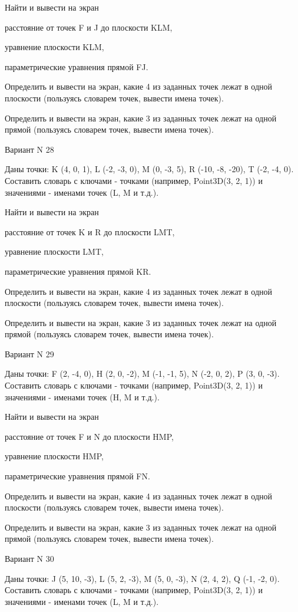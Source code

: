 \documentclass[11pt]{report}
\begin{document}
 
Найти и вывести на экран


расстояние от точек F и J до плоскости KLM,

 
уравнение плоскости KLM,

 
параметрические уравнения прямой FJ.


Определить и вывести на экран, какие 4 из заданных точек лежат в одной плоскости (пользуясь словарем точек, вывести имена точек).


Определить и вывести на экран, какие 3 из заданных точек лежат на одной прямой (пользуясь словарем точек, вывести имена точек).

Вариант N 28

Даны точки: K (4, 0, 1), L (-2, -3, 0), M (0, -3, 5), R (-10, -8, -20), T (-2, -4, 0).
Составить словарь с ключами - точками (например, Point3D(3, 2, 1)) и значениями - именами точек (L, M и т.д.).

 
Найти и вывести на экран


расстояние от точек K и R до плоскости LMT,

 
уравнение плоскости LMT,

 
параметрические уравнения прямой KR.


Определить и вывести на экран, какие 4 из заданных точек лежат в одной плоскости (пользуясь словарем точек, вывести имена точек).


Определить и вывести на экран, какие 3 из заданных точек лежат на одной прямой (пользуясь словарем точек, вывести имена точек).

Вариант N 29

Даны точки: F (2, -4, 0), H (2, 0, -2), M (-1, -1, 5), N (-2, 0, 2), P (3, 0, -3).
Составить словарь с ключами - точками (например, Point3D(3, 2, 1)) и значениями - именами точек (H, M и т.д.).

 
Найти и вывести на экран


расстояние от точек F и N до плоскости HMP,

 
уравнение плоскости HMP,

 
параметрические уравнения прямой FN.


Определить и вывести на экран, какие 4 из заданных точек лежат в одной плоскости (пользуясь словарем точек, вывести имена точек).


Определить и вывести на экран, какие 3 из заданных точек лежат на одной прямой (пользуясь словарем точек, вывести имена точек).

Вариант N 30

Даны точки: J (5, 10, -3), L (5, 2, -3), M (5, 0, -3), N (2, 4, 2), Q (-1, -2, 0).
Составить словарь с ключами - точками (например, Point3D(3, 2, 1)) и значениями - именами точек (L, M и т.д.).
\end{document}
